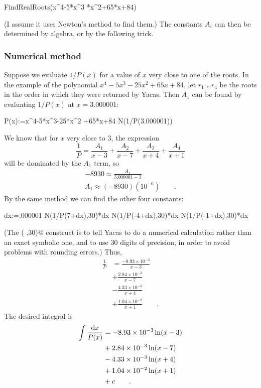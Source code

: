 \begin{Code}
  \ii FindRealRoots(x^4-5*x^3
  *x^2+65*x+84)
\end{Code}

(I assume it uses Newton's method to find them.) The constants
$A_i$ can then be determined by algebra, or by the following trick.

\subsubsection{Numerical method}\label{partial-fractions-numerical}
Suppose we evaluate
$1/P(x)$ for a value of $x$ very close to one of the roots.
In the example of the polynomial 
$x^4-5x^3-25x^2+65x+84$, let $r_1$ \ldots $r_4$ be the roots in the
order in which they were returned by Yacas. Then $A_1$ can be
found by evaluating $1/P(x)$ at $x=3.000001$:\label{residue-method-numerical}

\begin{Code}
  \ii P(x):=x^4-5*x^3-25*x^2
  \ii   +65*x+84
  \ii N(1/P(3.000001))
\end{Code}

We know that for $x$ very close to 3, the expression
\begin{equation*}
  \frac{1}{P} = \frac{A_1}{x-3}+\frac{A_2}{x-7}+\frac{A_3}{x+4}+\frac{A_4}{x+1}
\end{equation*}
will be dominated by the $A_1$ term, so
\begin{gather*}
  -8930 \approx \frac{A_1}{3.000001-3} \\
  A_1 \approx (-8930)(10^{-6})  \qquad .
\end{gather*}
By the same method we can find the other four constants:
\begin{Code}
  \ii dx:=.000001
  \ii N(1/P(7+dx),30)*dx
  \ii N(1/P(-4+dx),30)*dx
  \ii N(1/P(-1+dx),30)*dx
\end{Code}
(The \verb@N( ,30)@ construct is to tell Yacas to do a numerical calculation rather than an exact
symbolic one, and to use 30 digits of precision, in order to
avoid problems with rounding errors.) Thus, \begin{align*}
  \frac{1}{P} &= \frac{-8.93\times10^{-3}}{x-3} \\
              &+ \frac{2.84\times10^{-3}}{x-7} \\
              &- \frac{4.33\times10^{-3}}{x+4} \\
              &+ \frac{1.04\times10^{-2}}{x+1} \qquad .
\end{align*}
The desired integral is
\begin{align*}
  \int \frac{\textup{d} x}{P(x)} &= -8.93\times10^{-3}\ln(x-3) \\
              & +2.84\times10^{-3}\ln(x-7) \\
              & -4.33\times10^{-3}\ln(x+4) \\
              &+ 1.04\times10^{-2}\ln(x+1) \\
              &+c \qquad .
\end{align*}


